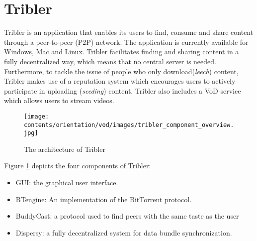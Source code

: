 \section{Tribler}
Tribler is an application that enables its users to find, consume and share content through a peer-to-peer (P2P) network. The application is currently available for Windows, Mac and Linux. Tribler facilitates finding and sharing content in a fully decentralized way, which means that no central server is needed. Furthermore, to tackle the issue of people who only download(\emph{leech}) content, Tribler makes use of a reputation system which encourages users to actively participate in uploading (\emph{seeding}) content. Tribler also includes a VoD service which allows users to stream videos.

\begin{figure}[h]
	\centering
	\texttt{[image: contents/orientation/vod/images/tribler\_component\_overview.jpg]}
	\caption{The architecture of Tribler\protect\footnotemark}
	\label{fig:tribler_components}
\end{figure}
\noindent Figure \ref{fig:tribler_components} depicts the four components of Tribler:
\begin{itemize}
	\item GUI: the graphical user interface.
	\item BTengine: An implementation of the BitTorrent protocol.
	\item BuddyCast: a protocol used to find peers with the same taste as the user\cite{tribler}
	\item Dispersy: a fully decentralized system for data bundle synchronization\cite{dispersy}.
\end{itemize}

